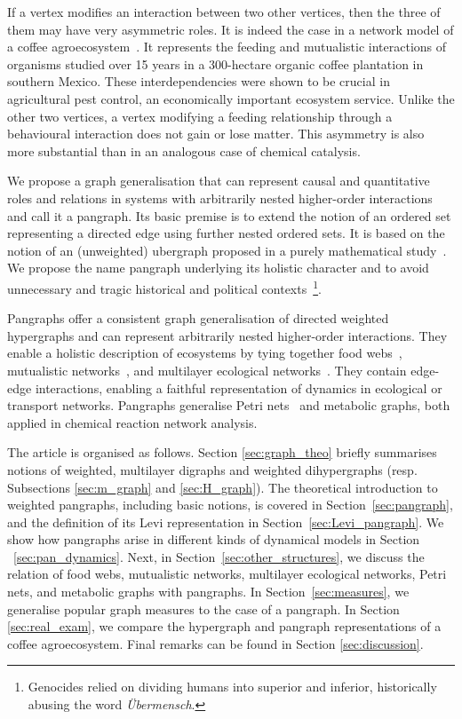 \documentclass[a4paper,12pt]{article}
\theoremstyle{definition}
\theoremstyle{remark}
\begin{document}
    If a vertex modifies an interaction between two other vertices, then the three of them may have very asymmetric roles. It is indeed the case in a network model of a coffee agroecosystem~\cite{Vandermeer_2010, Perfecto_coffe_agroeco, GOLUBSKI2016344}. It represents the feeding and mutualistic interactions of organisms studied over 15 years in a 300-hectare organic coffee plantation in southern Mexico. These interdependencies were shown to be crucial in agricultural pest control, an economically important ecosystem service. Unlike the other two vertices, a vertex modifying a feeding relationship through a
behavioural interaction does not gain or lose matter. This
asymmetry is also more substantial than in an analogous case of chemical catalysis.

    We propose a graph generalisation that can represent causal and quantitative roles and relations in systems with arbitrarily nested higher-order interactions and call it a pangraph. Its basic premise is to extend the notion of an ordered set representing a directed edge using further nested ordered sets. It is based on the notion of an (unweighted) ubergraph proposed in a purely mathematical study~\cite{Joslyn2017_ubergraph}. We propose the name pangraph underlying its holistic character and to avoid unnecessary and tragic historical and political contexts~\footnote{Genocides relied on dividing humans into superior and inferior, historically abusing the word \emph{\"Ubermensch}.}.

    Pangraphs offer a consistent graph generalisation of directed weighted hypergraphs and can represent arbitrarily nested higher-order interactions. They enable a holistic description of ecosystems by tying together food webs~\cite{food_webs_pimm}, mutualistic networks~\cite{Bascompte_Mutualistic_networks}, and multilayer ecological networks~\cite{Pilosof_2015, Lurgi_2020, Hutchinson2019}. They contain edge-edge interactions, enabling a faithful representation of dynamics in ecological or transport networks. Pangraphs generalise Petri nets~\cite{Petri_thesis, Petri_Peterson_book, Baez_open_petri_2017} and metabolic graphs, both applied in chemical reaction network analysis.
    
The article is organised as follows. Section \ref{sec:graph_theo} briefly summarises notions of weighted, multilayer digraphs and weighted dihypergraphs (resp. Subsections \ref{sec:m_graph} and \ref{sec:H_graph}). The theoretical introduction to weighted pangraphs, including basic notions, is covered in Section~\ref{sec:pangraph}, and the definition of its Levi representation in Section~\ref{sec:Levi_pangraph}. We show how pangraphs arise in different kinds of dynamical models in Section ~\ref{sec:pan_dynamics}.
Next, in Section~\ref{sec:other_structures}, we discuss the relation of food webs, mutualistic networks, multilayer ecological networks, Petri nets, and metabolic graphs with pangraphs. In Section~\ref{sec:measures}, we generalise popular graph measures to the case of a pangraph. In Section \ref{sec:real_exam}, we compare the hypergraph and pangraph representations of a coffee agroecosystem. Final remarks can be found in Section \ref{sec:discussion}.
\end{document}
